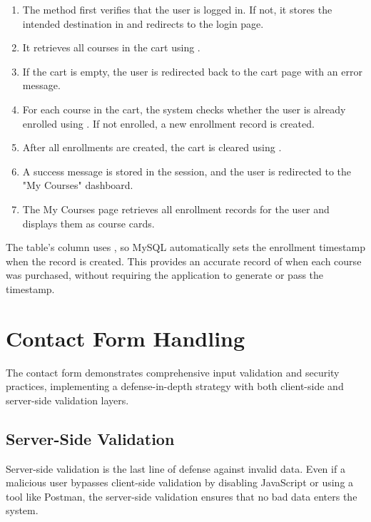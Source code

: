 \documentclass[12pt,a4paper]{report}
\begin{document}
\begin{enumerate}
    \item The  method first verifies that the user is logged in. If not, it stores the intended destination in  and redirects to the login page.
    \item It retrieves all courses in the cart using .
    \item If the cart is empty, the user is redirected back to the cart page with an error message.
    \item For each course in the cart, the system checks whether the user is already enrolled using . If not enrolled, a new enrollment record is created.
    \item After all enrollments are created, the cart is cleared using .
    \item A success message is stored in the session, and the user is redirected to the "My Courses" dashboard.
    \item The My Courses page retrieves all enrollment records for the user and displays them as course cards.
\end{enumerate}

The  table's  column uses , so MySQL automatically sets the enrollment timestamp when the record is created. This provides an accurate record of when each course was purchased, without requiring the application to generate or pass the timestamp.

\section{Contact Form Handling}

The contact form demonstrates comprehensive input validation and security practices, implementing a defense-in-depth strategy with both client-side and server-side validation layers.

\subsection{Server-Side Validation}

Server-side validation is the last line of defense against invalid data. Even if a malicious user bypasses client-side validation by disabling JavaScript or using a tool like Postman, the server-side validation ensures that no bad data enters the system.
\end{document}
